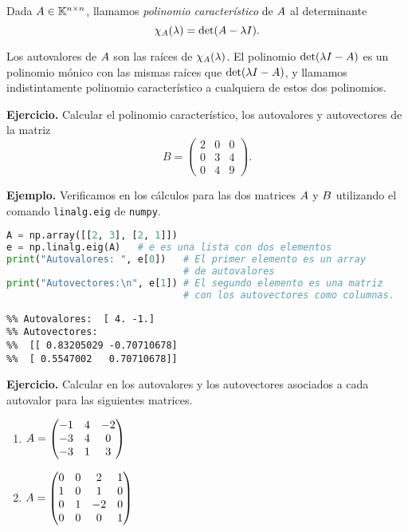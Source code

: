 \begin{defi}
Dada $\Ab \in  \Knn$, llamamos \emph{polinomio característico} de $\Ab$ al determinante
$$
\chi_{\Ab}(\lambda) = \det(\Ab - \lambda \Ib).
$$
\end{defi}

Los autovalores de $\Ab$ son las raíces de $\chi_{\Ab}(\lambda)$. El polinomio $\det(\lambda \Ib - \Ab)$ es un polinomio mónico con las mismas raíces que $\det(\lambda \Ib - \Ab)$, y llamamos indistintamente polinomio característico a cualquiera de estos dos polinomios.


\textbf{Ejercicio.} Calcular el polinomio característico, los autovalores y autovectores de la matriz
$$B = \begin{pmatrix} 2 & 0 & 0 \\ 0 & 3 & 4 \\ 0 & 4 & 9 \end{pmatrix}.$$

\textbf{Ejemplo.} Verificamos en \python los cálculos para las dos matrices $\Ab$ y
$\Bb$ utilizando el comando \texttt{linalg.eig} de \texttt{numpy}.

\begin{Shaded}
\begin{lstlisting}[language=python]
A = np.array([[2, 3], [2, 1]])
e = np.linalg.eig(A)   # e es una lista con dos elementos
print("Autovalores: ", e[0])   # El primer elemento es un array
                               # de autovalores
print("Autovectores:\n", e[1]) # El segundo elemento es una matriz
                               # con los autovectores como columnas.
\end{lstlisting}
\end{Shaded}

\begin{verbatim}
%% Autovalores:  [ 4. -1.]
%% Autovectores:
%%  [[ 0.83205029 -0.70710678]
%%  [ 0.5547002   0.70710678]]
\end{verbatim}

\textbf{Ejercicio.} Calcular en \python los autovalores y los autovectores
asociados a cada autovalor para las siguientes matrices.

\begin{enumerate}
\item $\Ab =\begin{pmatrix} -1 & 4 & -2 \\ -3 & 4 & 0 \\ -3 & 1 & 3 \end{pmatrix}$
\item $\Ab = \begin{pmatrix} 0 & 0 & 2 & 1 \\ 1 & 0 & 1 & 0 \\ 0 & 1 & -2 & 0 \\ 0 & 0 & 0 & 1 \end{pmatrix}$
\end{enumerate}

